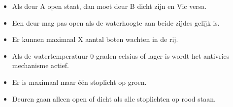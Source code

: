 \documentclass{article}
\begin{document}
\begin{itemize}


\item Als deur A open staat, dan moet deur B dicht zijn en Vic versa.
\item Een deur mag pas open als de waterhoogte aan beide zijdes gelijk is.
\item Er kunnen maximaal X aantal boten wachten in de rij.
\item Als de watertemperatuur 0 graden celsius of lager is wordt het antivries mechanisme actief.
\item Er is maximaal maar één stoplicht op groen.
\item Deuren gaan alleen open of dicht als alle stoplichten op rood staan.


\end{itemize}

\vskip2cm


\clearpage %
\end{document}
